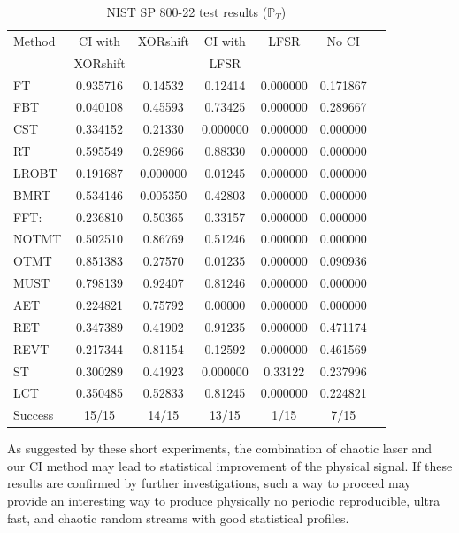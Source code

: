 \begin{table}[!t]
  \renewcommand{\arraystretch}{1.3}
  \caption{NIST SP 800-22 test results ($\mathbb{P}_T$)}
  \label{nist ci chaotic laser}
  \centering
  \begin{tabular}{|l|c|c|c|c|c|c|}
    \hline
    Method & CI with  & XORshift &  CI with & LFSR & No CI  \\ 
           & XORshift &          &  LFSR   &       &         \\\hline\hline
    FT 	&  0.935716 &  0.14532 & 0.12414&  0.000000&  0.171867  \\ \hline
    FBT 	 & 0.040108 & 0.45593 & 0.73425& 0.000000&  0.289667 \\ \hline
    CST 	&  0.334152 & 0.21330 &  0.000000& 0.000000&  0.000000 \\ \hline
    RT 	&  0.595549 &  0.28966 & 0.88330&  0.000000&  0.000000 \\ \hline
    LROBT 	 & 0.191687 &  0.000000 & 0.01245& 0.000000&  0.000000 \\ \hline
    BMRT 	 & 0.534146 &  0.005350 & 0.42803&  0.000000&  0.000000 \\ \hline
    FFT: 	 & 0.236810 &  0.50365 &0.33157 &  0.000000&  0.000000 \\ \hline
    NOTMT	&  0.502510 &  0.86769 &0.51246 &  0.000000&  0.000000 \\ \hline
    OTMT 	&  0.851383 &  0.27570 &0.01235 &  0.000000&  0.090936 \\ \hline
    MUST 	  &0.798139 &  0.92407 & 0.81246& 0.000000&  0.000000 \\ \hline
    AET &	  0.224821 &  0.75792 &0.00000 & 0.000000&  0.000000 \\ \hline
    RET 	&  0.347389 &  0.41902& 0.91235 &  0.000000&  0.471174 \\ \hline
    REVT &	  0.217344 &  0.81154 &0.12592 &  0.000000&  0.461569 \\ \hline
    ST	 & 0.300289 &  0.41923 &  0.000000& 0.33122 & 0.237996\\ \hline
    LCT &	  0.350485 &  0.52833 &0.81245&  0.000000&  0.224821\\ \hline
Success 			&15/15		&14/15 &13/15	 &1/15		&7/15 \\ \hline
  \end{tabular}
\end{table}



As suggested by these short experiments, the combination of chaotic laser and our CI method 
may lead to statistical improvement of the physical signal. 
If these results are confirmed by further investigations, such a way 
to proceed may provide an interesting way to produce physically no periodic
reproducible, ultra fast, and chaotic random streams with good statistical profiles.

 
